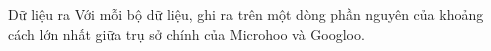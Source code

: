 Dữ liệu ra
Với mỗi bộ dữ liệu, ghi ra trên một dòng phần nguyên của khoảng cách lớn nhất giữa trụ sở chính của Microhoo và Googloo.